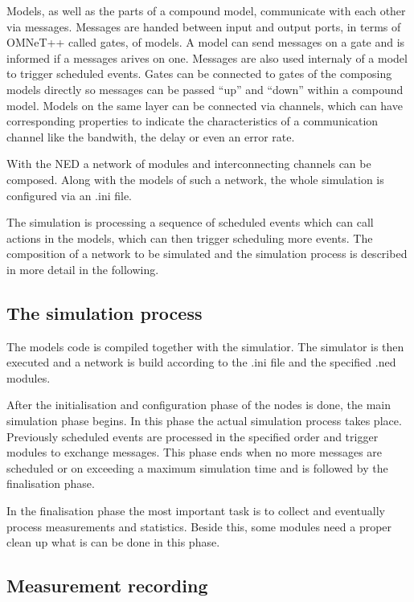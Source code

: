 Models, as well as the parts of a compound model, communicate with each other via messages. Messages are handed between input and output ports, in terms of OMNeT++ called gates, of models. A model can send messages on a gate and is informed if a messages arives on one. Messages are also used internaly of a model to trigger scheduled events. Gates can be connected to gates of the composing models directly so messages can be passed ``up'' and ``down'' within a compound model. Models on the same layer can be connected via channels, which can have corresponding properties to indicate the characteristics of a communication channel like the bandwith, the delay or even an error rate.

With the NED a network of modules and interconnecting channels can be composed. Along with the models of such a network, the whole simulation is configured via an .ini file.

The simulation is processing a sequence of scheduled events which can call actions in the models, which can then trigger scheduling more events. The composition of a network to be simulated and the simulation process is described in more detail in the following.

\subsection{The simulation process}

The models code is compiled together with the simulatior. The simulator is then executed and a network is build according to the .ini file and the specified .ned modules.

After the initialisation and configuration phase of the nodes is done, the main simulation phase begins. In this phase the actual simulation process takes place. Previously scheduled events are processed in the specified order and trigger modules to exchange messages. This phase ends when no more messages are scheduled or on exceeding a maximum simulation time and is followed by the finalisation phase.

In the finalisation phase the most important task is to collect and eventually process measurements and statistics. Beside this, some modules need a proper clean up what is can be done in this phase.

\subsection{Measurement recording}

